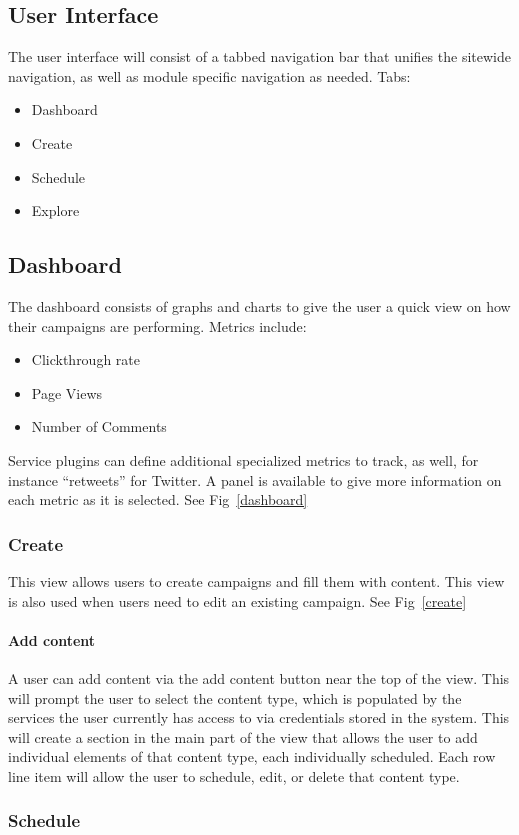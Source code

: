 \documentclass{article}
\begin{document}
\begin{description}
\section{User Interface} %
The user interface will consist of a tabbed navigation bar that
unifies the sitewide navigation, as well as module specific navigation
as needed. Tabs:
\begin{itemize}
\item Dashboard
\item Create
\item Schedule
\item Explore
\end{itemize}
\subsection{Dashboard}
The dashboard consists of graphs and charts to give the user a quick
view on how their campaigns are performing.  Metrics include:
\begin{itemize}
\item Clickthrough rate
\item Page Views
\item Number of Comments
\end{itemize}
Service plugins can define additional specialized metrics to track, as
well, for instance ``retweets'' for Twitter.  A panel is available to
give more information on each metric as it is selected. See Fig~\ref{dashboard}
\subsubsection{Create}
This view allows users to create campaigns and fill them with content.
This view is also used when users need to edit an existing
campaign. See Fig~\ref{create}
\paragraph{Add content}
A user can add content via the add content button near the top of the
view.  This will prompt the user to select the content type, which is
populated by the services the user currently has access to via
credentials stored in the system. This will create a section in the
main part of the view that allows the user to add individual elements
of that content type, each individually scheduled.  Each row line item
will allow the user to schedule, edit, or delete that content type.
\subsubsection{Schedule}

\end{description}
\end{document}
